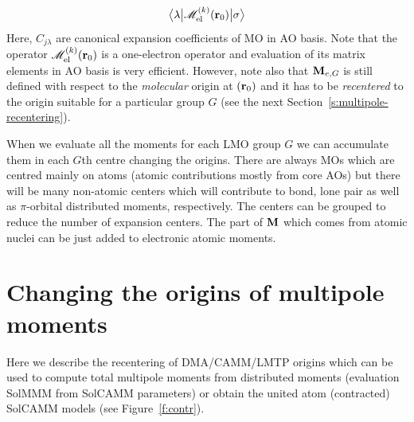 \documentclass[a4paper,titlepage,twoside,fleqn,12pt]{book}
\newcommand{\tbraket}[3]{\ensuremath{\bigl\langle {#1} \bigl\lvert {#2} \bigl\lvert {#3} \bigr\rangle}}
\begin{document}
\begin{appendices}
\begin{refsection}
\begin{equation}
   \tbraket{\lambda}{\mathscr{M}^{(k)}_{\rm el}({\bf r}_0)}{\sigma}
\end{equation}
%
Here, $C_{j\lambda}$ are canonical expansion coefficients of MO in AO basis. Note that the
operator $\mathscr{M}^{(k)}_{\rm el}({\bf r}_0)$ is a one\hyp{}electron operator
and evaluation of its matrix elements in AO basis is very efficient. However, 
note also that ${\bf M}_{e,G}$ is still defined with respect to the \emph{molecular} origin at $({\bf r}_0)$
and it has to be \emph{recentered} to the origin suitable for a particular group $G$ (see the
next Section~\ref{s:multipole-recentering}).

When we evaluate all the moments for each LMO group $G$ we can accumulate them in each $G$th centre
changing the origins. There are always MOs which are centred mainly on atoms (atomic contributions
mostly from core AOs) but there will be many non-atomic centers which will contribute to bond, lone pair
as well as $\pi$\hyp{}orbital distributed moments, respectively. The centers can be grouped to reduce the number
of expansion centers. The part of $\bf M$ which comes from atomic
nuclei can be just added to electronic atomic moments.

\section{Changing the origins of multipole moments\label{s:multipole-recentering}}

Here we describe the recentering of DMA/CAMM/LMTP origins which can be used
to compute total multipole moments from distributed moments (evaluation SolMMM from SolCAMM parameters)
or obtain the united atom (contracted) SolCAMM models (see Figure~\ref{f:contr}).


\end{refsection}
\end{appendices}
\end{document}

